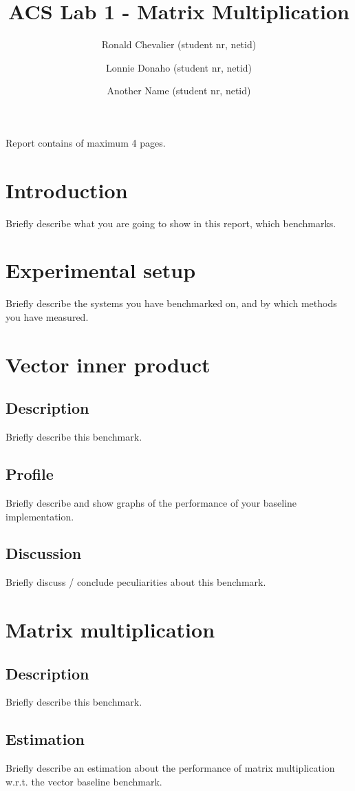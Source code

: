 \documentclass[twocolumn]{article}
\title{\large{\textbf{ACS Lab 1 - Matrix Multiplication}}}
\author{
    \small Ronald Chevalier (student nr, netid)
    \and \small Lonnie Donaho (student nr, netid)
    \and \small Another Name (student nr, netid)
}
\date{}
\begin{document}
\maketitle

\begin{center}
    \footnotesize{Report contains \pageref{LastPage} of maximum 4 pages.}
\end{center}

\section{Introduction}
Briefly describe what you are going to show in this report, which benchmarks.

\section{Experimental setup}
Briefly describe the systems you have benchmarked on, and by which methods you have measured.

\section{Vector inner product}
\subsection{Description}
Briefly describe this benchmark.
\subsection{Profile}
Briefly describe and show graphs of the performance of your baseline implementation.
\subsection{Discussion}
Briefly discuss / conclude peculiarities about this benchmark.

\section{Matrix multiplication}
\subsection{Description}
Briefly describe this benchmark.
\subsection{Estimation}
Briefly describe an estimation about the performance of matrix multiplication w.r.t. the vector baseline benchmark.
\end{document}
